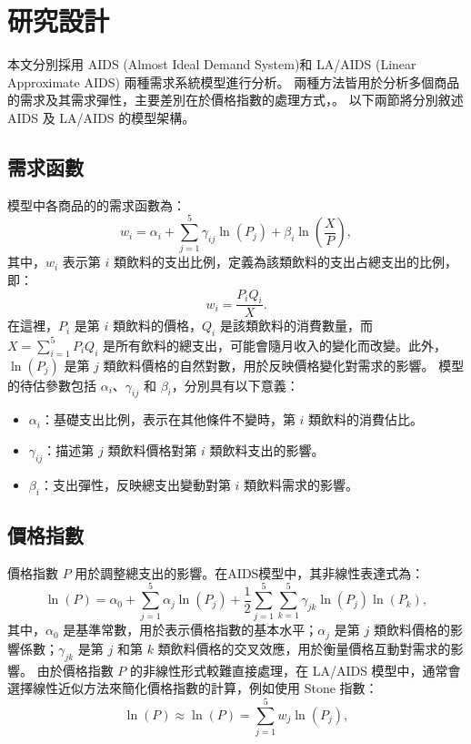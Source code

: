 \section{研究設計}

本文分別採用 AIDS (Almost Ideal Demand System)和 LA/AIDS (Linear Approximate AIDS) 兩種需求系統模型進行分析。
兩種方法皆用於分析多個商品的需求及其需求彈性，主要差別在於價格指數的處理方式，。
以下兩節將分別敘述 AIDS 及 LA/AIDS 的模型架構。

\subsection*{需求函數}
 模型中各商品的的需求函數為：
\begin{equation}
w_i = \alpha_i + \sum_{j=1}^{5} \gamma_{ij} \ln(P_j) + \beta_i \ln\left(\frac{X}{P}\right),
\end{equation}
其中，\(w_i\) 表示第 \(i\) 類飲料的支出比例，定義為該類飲料的支出占總支出的比例，即：
\begin{equation}
w_i = \frac{P_i Q_i}{X}.
\end{equation}
在這裡，\(P_i\) 是第 \(i\) 類飲料的價格，\(Q_i\) 是該類飲料的消費數量，而 \(X = \sum_{i=1}^5 P_i Q_i\) 是所有飲料的總支出，可能會隨月收入的變化而改變。此外，\(\ln(P_j)\) 是第 \(j\) 類飲料價格的自然對數，用於反映價格變化對需求的影響。
模型的待估參數包括 \(\alpha_i\)、\(\gamma_{ij}\) 和 \(\beta_i\)，分別具有以下意義：
\begin{itemize}
    \item \(\alpha_i\)：基礎支出比例，表示在其他條件不變時，第 \(i\) 類飲料的消費佔比。
    \item \(\gamma_{ij}\)：描述第 \(j\) 類飲料價格對第 \(i\) 類飲料支出的影響。
    \item \(\beta_i\)：支出彈性，反映總支出變動對第 \(i\) 類飲料需求的影響。
\end{itemize}


\subsection*{價格指數}
價格指數 \(P\) 用於調整總支出的影響。在AIDS模型中，其非線性表達式為：
\begin{equation}
\ln(P) = \alpha_0 + \sum_{j=1}^{5} \alpha_j \ln(P_j) + \frac{1}{2} \sum_{j=1}^{5} \sum_{k=1}^{5} \gamma_{jk} \ln(P_j) \ln(P_k),
\end{equation}
其中，\(\alpha_0\) 是基準常數，用於表示價格指數的基本水平；\(\alpha_j\) 是第 \(j\) 類飲料價格的影響係數；\(\gamma_{jk}\) 是第 \(j\) 和第 \(k\) 類飲料價格的交叉效應，用於衡量價格互動對需求的影響。
由於價格指數 \(P\) 的非線性形式較難直接處理，在 LA/AIDS 模型中，通常會選擇線性近似方法來簡化價格指數的計算，例如使用 Stone 指數：
\begin{equation}
	\ln(P) \approx \ln(P) = \sum_{j=1}^{5} w_j \ln(P_j),
\end{equation}

